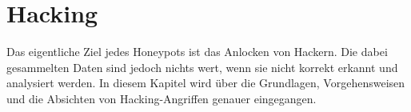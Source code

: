 \chapter{Hacking}

Das eigentliche Ziel jedes Honeypots ist das Anlocken von Hackern. Die dabei gesammelten Daten sind jedoch nichts wert, wenn sie nicht korrekt erkannt und analysiert werden. In diesem Kapitel wird über die Grundlagen, Vorgehensweisen und die Absichten von Hacking-Angriffen genauer eingegangen.



